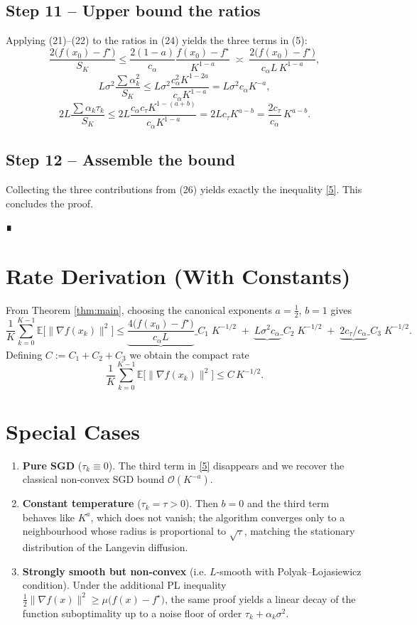 \documentclass{article}
\newcommand{\EE}{\mathbb{E}}
\begin{document}
\subsection*{Step 11 – Upper bound the ratios}
Applying (21)–(22) to the ratios in (24) yields the three terms in (5):
\[
\frac{2\bigl(f(x_{0})-f^{\star}\bigr)}{S_{K}}
\le
\frac{2(1-a)}{c_{\alpha}}\frac{f(x_{0})-f^{\star}}{K^{1-a}}
\;\asymp\;
\frac{2\bigl(f(x_{0})-f^{\star}\bigr)}{c_{\alpha}L\,K^{1-a}},
\]
\[
L\sigma^{2}\frac{\sum\alpha_{k}^{2}}{S_{K}}
\le
L\sigma^{2}\frac{c_{\alpha}^{2}K^{1-2a}}{c_{\alpha}K^{1-a}}
=
L\sigma^{2}c_{\alpha}K^{-a},
\]
\[
2L\frac{\sum\alpha_{k}\tau_{k}}{S_{K}}
\le
2L\frac{c_{\alpha}c_{\tau}K^{1-(a+b)}}{c_{\alpha}K^{1-a}}
=
2L c_{\tau}K^{a-b}
=
\frac{2c_{\tau}}{c_{\alpha}}\,K^{a-b}.
\tag{26}
\]

\subsection*{Step 12 – Assemble the bound}
Collecting the three contributions from (26) yields exactly the inequality \eqref{5}. This concludes the proof.

\begin{flushright}
\textbf{∎}
\end{flushright}

\section*{Rate Derivation (With Constants)}
From Theorem \ref{thm:main}, choosing the canonical exponents $a=\tfrac12$, $b=1$ gives
\[
\frac{1}{K}\sum_{k=0}^{K-1}\EE\!\bigl[\|\nabla f(x_{k})\|^{2}\bigr]
\le
\underbrace{\frac{4\bigl(f(x_{0})-f^{\star}\bigr)}{c_{\alpha}L}}\_{C_{1}}\;K^{-1/2}
\;+\;
\underbrace{L\sigma^{2}c_{\alpha}}\_{C_{2}}\;K^{-1/2}
\;+\;
\underbrace{2c_{\tau}/c_{\alpha}}\_{C_{3}}\;K^{-1/2}.
\]
Defining $C:=C_{1}+C_{2}+C_{3}$ we obtain the compact rate
\[
\frac{1}{K}\sum_{k=0}^{K-1}\EE\!\bigl[\|\nabla f(x_{k})\|^{2}\bigr]\le
C\,K^{-1/2}.
\]

\section*{Special Cases}
\begin{enumerate}[label=(\alph*)]
\item \textbf{Pure SGD} ($\tau_{k}\equiv0$). The third term in \eqref{5} disappears and we recover the classical non‑convex SGD bound $\mathcal O(K^{-a})$.
\item \textbf{Constant temperature} ($\tau_{k}=\tau>0$). Then $b=0$ and the third term behaves like $K^{a}$, which does not vanish; the algorithm converges only to a neighbourhood whose radius is proportional to $\sqrt{\tau}$, matching the stationary distribution of the Langevin diffusion.
\item \textbf{Strongly smooth but non‑convex} (i.e. $L$‑smooth with Polyak–Łojasiewicz condition). Under the additional PL inequality $\frac12\|\nabla f(x)\|^{2}\ge \mu\bigl(f(x)-f^{\star}\bigr)$, the same proof yields a linear decay of the function suboptimality up to a noise floor of order $\tau_{k}+\alpha_{k}\sigma^{2}$.
\end{enumerate}
\end{document}
